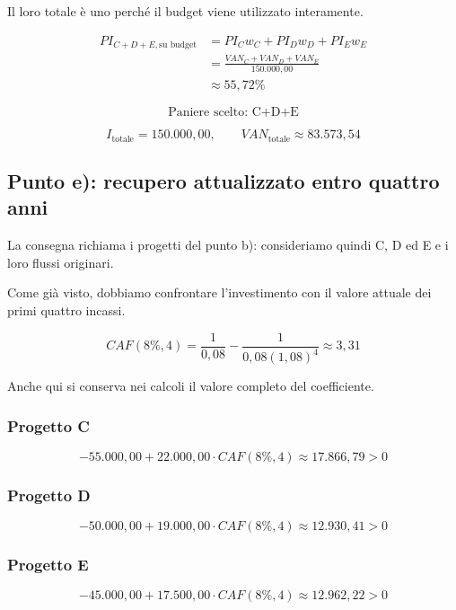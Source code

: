 \noindent Il loro totale è uno perché il budget viene utilizzato
interamente.

\[
    \begin{aligned}
        PI_{C+D+E,\text{su budget}}
        &=
        PI_Cw_C+PI_Dw_D+PI_Ew_E\\
        &=
        \frac{VAN_C+VAN_D+VAN_E}{150.000{,}00}\\
        &\approx55{,}72\%
    \end{aligned}
\]

\[
    \boxed{\text{Paniere scelto: C+D+E}}
\]

\[
    \boxed{
        I_{\text{totale}}=150.000{,}00,
        \qquad VAN_{\text{totale}}\approx83.573{,}54
    }
\]

\subsection{Punto e): recupero attualizzato entro quattro anni}

\noindent La consegna richiama i progetti del punto b):
consideriamo quindi C, D ed E e i loro flussi originari.

\noindent Come già visto, dobbiamo confrontare l'investimento
con il valore attuale dei primi quattro incassi.

\[
    CAF(8\%,4)
    =
    \frac{1}{0{,}08}
    -
    \frac{1}{0{,}08(1{,}08)^4}
    \approx3{,}31
\]

\noindent Anche qui si conserva nei calcoli il valore completo
del coefficiente.

\subsubsection*{Progetto C}

\[
    -55.000{,}00
    +22.000{,}00\cdot CAF(8\%,4)
    \approx17.866{,}79>0
\]

\subsubsection*{Progetto D}

\[
    -50.000{,}00
    +19.000{,}00\cdot CAF(8\%,4)
    \approx12.930{,}41>0
\]

\subsubsection*{Progetto E}

\[
    -45.000{,}00
    +17.500{,}00\cdot CAF(8\%,4)
    \approx12.962{,}22>0
\]

